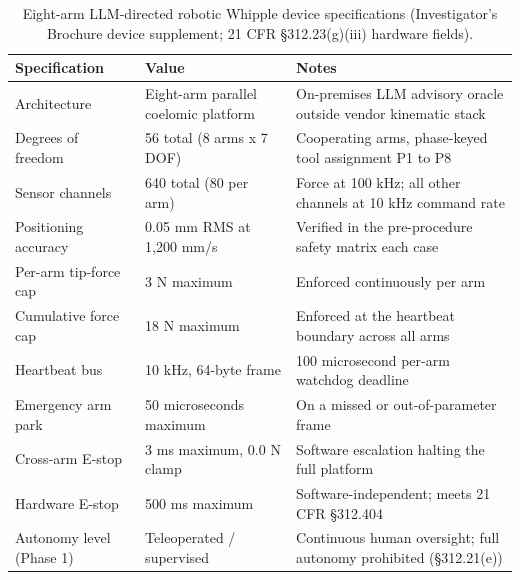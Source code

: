 \begin{table}[t]
\caption{Eight-arm LLM-directed robotic Whipple device specifications (Investigator's Brochure device supplement; 21 CFR \S 312.23(g)(iii) hardware fields).}
\label{tab:sec04-device}
\centering
\begin{tabularx}{\textwidth}{L{4.4cm} L{4.3cm} Y}
\toprule
\textbf{Specification} & \textbf{Value} & \textbf{Notes} \\
\midrule
Architecture & Eight-arm parallel coelomic platform & On-premises LLM advisory oracle outside vendor kinematic stack \\
Degrees of freedom & 56 total (8 arms x 7 DOF) & Cooperating arms, phase-keyed tool assignment P1 to P8 \\
Sensor channels & 640 total (80 per arm) & Force at 100 kHz; all other channels at 10 kHz command rate \\
Positioning accuracy & 0.05 mm RMS at 1,200 mm/s & Verified in the pre-procedure safety matrix each case \\
Per-arm tip-force cap & 3 N maximum & Enforced continuously per arm \\
Cumulative force cap & 18 N maximum & Enforced at the heartbeat boundary across all arms \\
Heartbeat bus & 10 kHz, 64-byte frame & 100 microsecond per-arm watchdog deadline \\
Emergency arm park & 50 microseconds maximum & On a missed or out-of-parameter frame \\
Cross-arm E-stop & 3 ms maximum, 0.0 N clamp & Software escalation halting the full platform \\
Hardware E-stop & 500 ms maximum & Software-independent; meets 21 CFR \S 312.404 \\
Autonomy level (Phase 1) & Teleoperated / supervised & Continuous human oversight; full autonomy prohibited (\S 312.21(e)) \\
\bottomrule
\end{tabularx}
\end{table}

